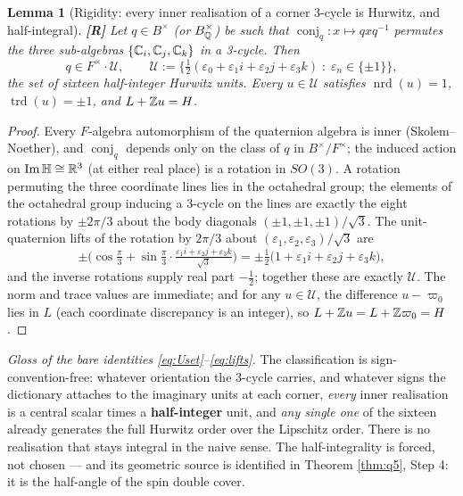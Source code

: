 \documentclass[11pt,a4paper]{article}
\theoremstyle{plain}
\newtheorem{lemma}{Lemma}
\theoremstyle{definition}
\theoremstyle{remark}
\newcommand{\HH}{\mathbb{H}}
\newcommand{\Uset}{\mathcal{U}}
\newcommand{\conj}[1]{\operatorname{conj}_{#1}}
\newcommand{\rtag}[1]{\textnormal{\textbf{[#1]}}}
\DeclareMathOperator{\trd}{trd}
\DeclareMathOperator{\nrd}{nrd}
\DeclareMathOperator{\ImH}{Im}
\begin{document}
\begin{lemma}[Rigidity: every inner realisation of a corner 3-cycle is Hurwitz, and half-integral]\label{lem:rigidity}
\rtag{R} Let $q \in B^\times$ (or $B_{\mathbb{Q}}^\times$) be such that $\conj{q} : x \mapsto qxq^{-1}$ permutes the three sub-algebras $\{\mathbb{C}_i, \mathbb{C}_j, \mathbb{C}_k\}$ in a 3-cycle. Then
\begin{equation}\label{eq:Uset}
q \in F^\times \cdot \Uset, \qquad
\Uset := \big\{ \tfrac12(\varepsilon_0 + \varepsilon_1 i + \varepsilon_2 j + \varepsilon_3 k) \;:\; \varepsilon_n \in \{\pm1\} \big\},
\end{equation}
the set of sixteen half-integer Hurwitz units. Every $u \in \Uset$ satisfies $\nrd(u) = 1$, $\trd(u) = \pm1$, and $L + \mathbb{Z} u = H$.
\end{lemma}
\begin{proof}
Every $F$-algebra automorphism of the quaternion algebra is inner (Skolem--Noether), and $\conj{q}$ depends only on the class of $q$ in $B^\times/F^\times$; the induced action on $\ImH\HH \cong \R^3$ (at either real place) is a rotation in $SO(3)$. A rotation permuting the three coordinate lines lies in the octahedral group; the elements of the octahedral group inducing a 3-cycle on the lines are exactly the eight rotations by $\pm2\pi/3$ about the body diagonals $(\pm1,\pm1,\pm1)/\sqrt3$. The unit-quaternion lifts of the rotation by $2\pi/3$ about $(\varepsilon_1,\varepsilon_2,\varepsilon_3)/\sqrt3$ are
\begin{equation}\label{eq:lifts}
\pm\Big( \cos\tfrac{\pi}{3} + \sin\tfrac{\pi}{3}\cdot\tfrac{\varepsilon_1 i + \varepsilon_2 j + \varepsilon_3 k}{\sqrt3} \Big)
= \pm\tfrac12\big(1 + \varepsilon_1 i + \varepsilon_2 j + \varepsilon_3 k\big),
\end{equation}
and the inverse rotations supply real part $-\tfrac12$; together these are exactly $\Uset$. The norm and trace values are immediate; and for any $u \in \Uset$, the difference $u - \varpi_0$ lies in $L$ (each coordinate discrepancy is an integer), so $L + \mathbb{Z} u = L + \mathbb{Z}\varpi_0 = H$.
\end{proof}

\noindent\emph{Gloss of the bare identities \eqref{eq:Uset}--\eqref{eq:lifts}.} The classification is sign-convention-free: whatever orientation the 3-cycle carries, and whatever signs the dictionary attaches to the imaginary units at each corner, \emph{every} inner realisation is a central scalar times a \textbf{half-integer} unit, and \emph{any single one} of the sixteen already generates the full Hurwitz order over the Lipschitz order. There is no realisation that stays integral in the naive sense. The half-integrality is forced, not chosen --- and its geometric source is identified in Theorem \ref{thm:q5}, Step 4: it is the half-angle of the spin double cover.
\end{document}
